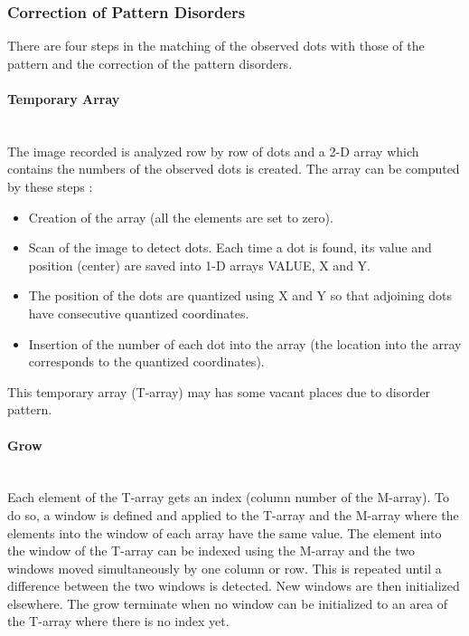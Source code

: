 \subsubsection{Correction of Pattern Disorders}
There are four steps in the matching of the observed dots with those of the pattern and the correction of the pattern disorders.





\paragraph*{Temporary Array}
~~\\
The image recorded is analyzed row by row of dots and a 2-D array which contains the numbers of the observed dots is created. The array can be computed by these steps :
\begin{itemize}
\item Creation of the array (all the elements are set to zero).
\item Scan of the image to detect dots. Each time a dot is found, its value and position (center) are saved into 1-D arrays VALUE, X and Y.
\item The position of the dots are quantized using X and Y so that adjoining dots have consecutive quantized coordinates.
\item Insertion of the number of each dot into the array (the location into the array corresponds to the quantized coordinates).
\end{itemize}

This temporary array (T-array) may has some vacant places due to disorder pattern.

\paragraph*{Grow}
~~\\
Each element of the T-array gets an index (column number of the M-array). To do so, a window is defined and applied to the T-array and the M-array where the elements into the window of each array have the same value. The element into the window of the T-array can be indexed using the M-array and the two windows moved simultaneously by one column or row. This is repeated until a difference between the two windows is detected. New windows are then initialized elsewhere. The grow terminate when no window can be initialized to an area of the T-array where there is no index yet.



